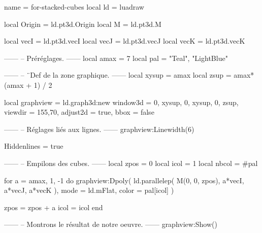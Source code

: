 \documentclass[border = 3pt]{standalone}
\begin{document}
\begin{luadraw*}{name = for-stacked-cubes}
local ld = luadraw

local Origin = ld.pt3d.Origin
local M      = ld.pt3d.M

local vecI = ld.pt3d.vecI
local vecJ = ld.pt3d.vecJ
local vecK = ld.pt3d.vecK

------
-- Préréglages.
------
local amax = 7
local pal  = {"Teal", "LightBlue"}

------
-- ¨Def de la zone graphique.
------
local xysup = amax
local zsup  = amax*(amax + 1) / 2

local graphview = ld.graph3d:new{
  window3d = {0, xysup, 0, xysup, 0, zsup},
  viewdir  = {155,70},
  adjust2d = true,
  bbox     = false
}

------
-- Réglages liés aux lignes.
------
graphview:Linewidth(6)

Hiddenlines = true

------
-- Empilons des cubes.
------
local zpos  = 0
local icol  = 1
local nbcol = #pal

for a = amax, 1, -1 do
  graphview:Dpoly(
    ld.parallelep(
      M(0, 0, zpos),
      a*vecI, a*vecJ, a*vecK
    ),
    {
      mode  = ld.mFlat,
      color = pal[icol]
    }
  )

  zpos = zpos + a
  icol = icol %
end

------
-- Montrons le résultat de notre oeuvre.
------
graphview:Show()
\end{luadraw*}
\end{document}
